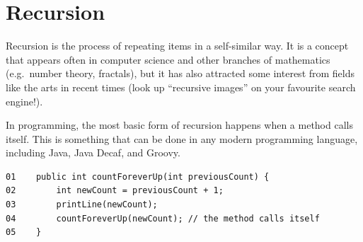 \section{Recursion}
\label{sec:recursion}

Recursion is the process of repeating items in a self-similar way. It
is a concept that appears often in computer science and other branches
of mathematics (e.g.~number theory, fractals), but it has also
attracted some interest from fields like the arts in recent times
(look up ``recursive images'' on your favourite search engine!). 

In programming, the most basic form of recursion happens when a method
calls itself. This is something that can be done in any modern 
programming language, including
Java, Java Decaf, and Groovy. 

% 
%
%
%

\begin{verbatim}
01    public int countForeverUp(int previousCount) {
02        int newCount = previousCount + 1;
03        printLine(newCount);
04        countForeverUp(newCount); // the method calls itself
05    }
\end{verbatim}

